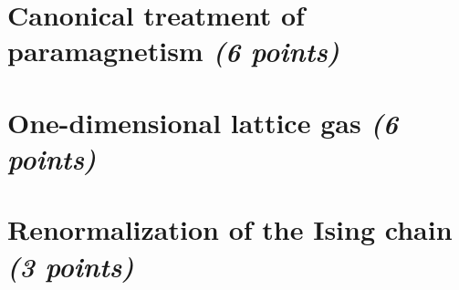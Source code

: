 \documentclass[11 pt]{article}
\begin{document}
    \section{
        Canonical treatment of paramagnetism
        \textit{(6 points)}
    }
    
    \newpage

    \section{One-dimensional lattice gas
        \textit{(6 points)}
    }
    
    \newpage

    \section{Renormalization of the Ising chain
        \textit{(3 points)}
    }
    
    \newpage
\end{document}
